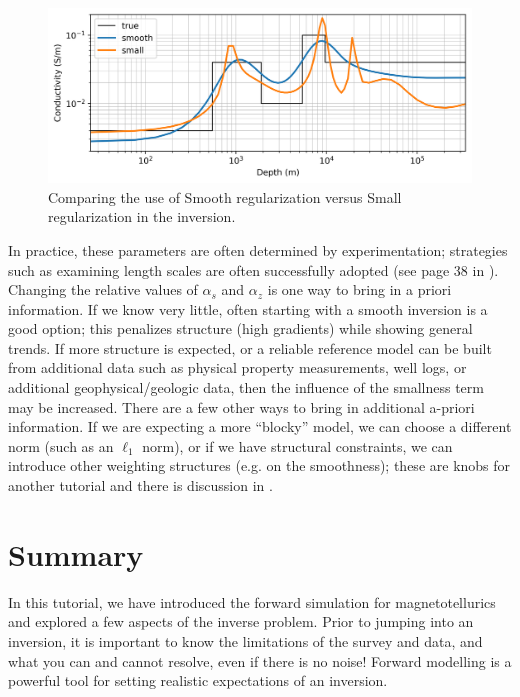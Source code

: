 \documentclass[11pt,oneside]{article}
\begin{document}
\begin{figure}[htb!]
    \centering
    \includegraphics[width=\textwidth]{images/alphas.png}
\caption{Comparing the use of Smooth regularization versus Small regularization in the inversion.}
\label{fig:alphas}
\end{figure}


In practice, these parameters are often determined by experimentation; strategies such as examining length scales are often successfully adopted (see page 38 in  \cite{OldenburgTutorial}). Changing the relative values of $\alpha_s$ and $\alpha_z$ is one way to bring in a priori information. If we know very little, often starting with a smooth inversion is a good option; this penalizes structure (high gradients) while showing general trends. If more structure is expected, or a reliable reference model can be built from additional data such as physical property measurements, well logs, or additional geophysical/geologic data, then the influence of the smallness term may be increased. There are a few other ways to bring in additional a-priori information. If we are expecting a more ``blocky'' model, we can choose a different norm (such as an $\ell_1$ norm), or if we have structural constraints, we can introduce other weighting structures (e.g. on the smoothness); these are knobs for another tutorial and there is discussion in \cite{OldenburgTutorial}.
\section{Summary}
In this tutorial, we have introduced the forward simulation for magnetotellurics and explored a few aspects of the inverse problem. Prior to jumping into an inversion, it is important to know the limitations of the survey and data, and what you can and cannot resolve, even if there is no noise! Forward modelling is a powerful tool for setting realistic expectations of an inversion.
\end{document}
